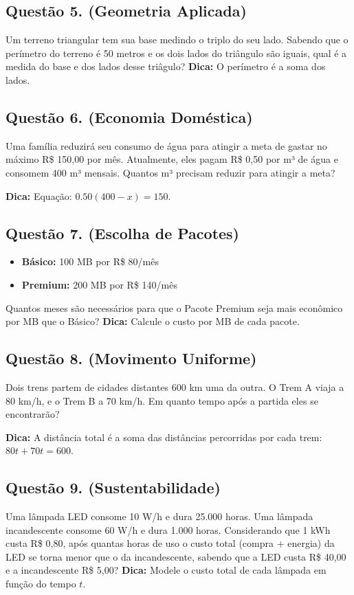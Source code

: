 \documentclass[11pt]{article}
\begin{document}
\begin{multicols}{2}
\subsection*{Questão 5. (Geometria Aplicada)}
Um terreno triangular tem sua base medindo o triplo do seu lado. Sabendo que o perímetro do terreno é 50 metros e os dois lados do triângulo são iguais, qual é a medida do base e dos lados desse triâgulo? \textbf{Dica:} O perímetro é a soma dos lados.

\subsection*{Questão 6. (Economia Doméstica)}
Uma família reduzirá seu consumo de água para atingir a meta de gastar no máximo R\$ 150,00 por mês. Atualmente, eles pagam R\$ 0,50 por m³ de água e consomem 400 m³ mensais. Quantos m³ precisam reduzir para atingir a meta?

\textbf{Dica:} Equação: \(0.50(400 - x) = 150\).


\subsection*{Questão 7. (Escolha de Pacotes)}
\begin{itemize}[noitemsep]
    \item \textbf{Básico:} 100 MB por R\$ 80/mês
    \item \textbf{Premium:} 200 MB por R\$ 140/mês
\end{itemize}
Quantos meses são necessários para que o Pacote Premium seja mais econômico por MB que o Básico? \textbf{Dica:} Calcule o custo por MB de cada pacote.


\subsection*{Questão 8. (Movimento Uniforme)}
Dois trens partem de cidades distantes 600 km uma da outra. O Trem A viaja a 80 km/h, e o Trem B a 70 km/h. Em quanto tempo após a partida eles se encontrarão?

\textbf{Dica:} A distância total é a soma das distâncias percorridas por cada
trem: \(80t + 70t = 600\).



\subsection*{Questão 9. (Sustentabilidade)}
Uma lâmpada LED consome 10 W/h e dura 25.000 horas. Uma lâmpada incandescente
consome 60 W/h e dura 1.000 horas. Considerando que 1 kWh custa R\$ 0,80, após
quantas horas de uso o custo total (compra + energia) da LED se torna menor que
o da incandescente, sabendo que a LED custa R\$ 40,00 e a incandescente R\$ 5,00?
\textbf{Dica:} Modele o custo total de cada lâmpada em função do tempo $t$.


\end{multicols}
\end{document}
